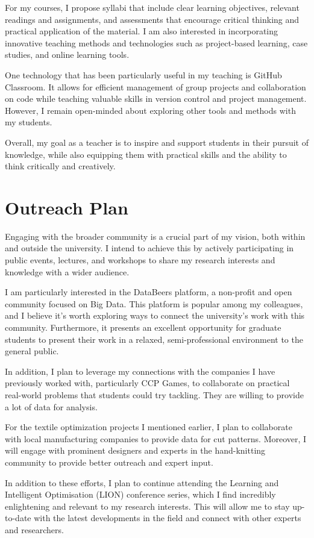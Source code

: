 \documentclass[]{cv} %
\begin{document}
	
For my courses, I propose syllabi that include clear learning objectives, relevant readings and assignments, and assessments that encourage critical thinking and practical application of the material. I am also interested in incorporating innovative teaching methods and technologies such as project-based learning, case studies, and online learning tools.

One technology that has been particularly useful in my teaching is GitHub Classroom. It allows for efficient management of group projects and collaboration on code while teaching valuable skills in version control and project management. However, I remain open-minded about exploring other tools and methods with my students.

Overall, my goal as a teacher is to inspire and support students in their pursuit of knowledge, while also equipping them with practical skills and the ability to think critically and creatively.


\section{Outreach Plan}
Engaging with the broader community is a crucial part of my vision, both within and outside the university. I intend to achieve this by actively participating in public events, lectures, and workshops to share my research interests and knowledge with a wider audience.

I am particularly interested in the DataBeers platform, a non-profit and open community focused on Big Data. This platform is popular among my colleagues, and I believe it's worth exploring ways to connect the university's work with this community. Furthermore, it presents an excellent opportunity for graduate students to present their work in a relaxed, semi-professional environment to the general public.

In addition, I plan to leverage my connections with the companies I have previously worked with, particularly CCP Games, to collaborate on practical real-world problems that students could try tackling. They are willing to provide a lot of data for analysis.

For the textile optimization projects I mentioned earlier, I plan to collaborate with local manufacturing companies to provide data for cut patterns. Moreover, I will engage with prominent designers and experts in the hand-knitting community to provide better outreach and expert input.

In addition to these efforts, I plan to continue attending the Learning and Intelligent Optimisation (LION) conference series, which I find incredibly enlightening and relevant to my research interests. This will allow me to stay up-to-date with the latest developments in the field and connect with other experts and researchers.
\end{document}
